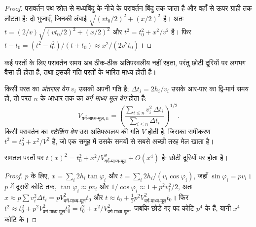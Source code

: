\begin{proof}
परावर्तन पथ स्रोत से मध्यबिंदु के नीचे के परावर्तन बिंदु तक जाता है और
वहाँ से ऊपर ग्राही तक लौटता है: दो भुजाएँ, जिनकी लंबाई
$\sqrt{(vt_0/2)^2 + (x/2)^2}$ है। अतः $t = (2/v)\sqrt{(vt_0/2)^2 + (x/2)^2}$ और
$t^2 = t_0^2 + x^2/v^2$ है। फिर $t - t_0 = (t^2 - t_0^2)/(t + t_0) \approx
x^2/(2v^2t_0)$।
\end{proof}

कई परतों के लिए परावर्तन समय अब ठीक-ठीक अतिपरवलीय नहीं रहता, परंतु
छोटी दूरियों पर लगभग वैसा ही होता है, तथा इसकी गति परतों के
भारित माध्य होती है।

\begin{definition}[स्टैकिंग, वर्ग-माध्य-मूल और अंतराल वेग]\label{def:b3:exploration-seismology:velocities}
किसी परत का \emph{अंतराल वेग} $v_i$ उसकी
अपनी गति है; $\Delta t_i = 2h_i/v_i$ उसके आर-पार का द्वि-मार्ग समय हो, तो
परत $n$ के आधार तक का \emph{वर्ग-माध्य-मूल वेग}
होता है:
\[
  V_{\text{वर्ग-माध्य-मूल},n} = \left(\frac{\sum_{i\le n}v_i^2\,\Delta t_i}{\sum_{i\le n}\Delta t_i}\right)^{1/2}.
\]
किसी परावर्तन का \emph{स्टैकिंग वेग} उस अतिपरवलय की गति $V$ होती है,
जिसका समीकरण $t^2 = t_0^2 + x^2/V^2$ है, जो एक
 समूह में उसके समयों से सबसे अच्छी तरह मेल खाता है।
\end{definition}

\begin{proposition}[छोटी दूरियों पर स्टैकिंग वेग]\label{prop:b3:exploration-seismology:rms}
समतल परतों पर $t(x)^2 = t_0^2 + x^2/V_{\text{वर्ग-माध्य-मूल}}^2 + O(x^4)$ है: छोटी
दूरियों पर   होता है।
\end{proposition}

\begin{proof}
 $p$ के लिए, $x = \sum_i 2h_i\tan\varphi_i$ और
$t = \sum_i 2h_i/(v_i\cos\varphi_i)$, जहाँ $\sin\varphi_i = pv_i$। $p$ में दूसरी
कोटि तक, $\tan\varphi_i \approx pv_i$ और $1/\cos\varphi_i \approx 1 +
p^2v_i^2/2$, अतः $x \approx p\sum v_i^2\Delta t_i = pV_{\text{वर्ग-माध्य-मूल}}^2t_0$ और
$t \approx t_0 + \tfrac12p^2V_{\text{वर्ग-माध्य-मूल}}^2t_0$। फिर
$t^2 \approx t_0^2 + p^2V_{\text{वर्ग-माध्य-मूल}}^2t_0^2 = t_0^2 + x^2/V_{\text{वर्ग-माध्य-मूल}}^2$, जबकि
छोड़े गए पद कोटि $p^4$ के हैं, यानी $x^4$ कोटि के।
\end{proof}

